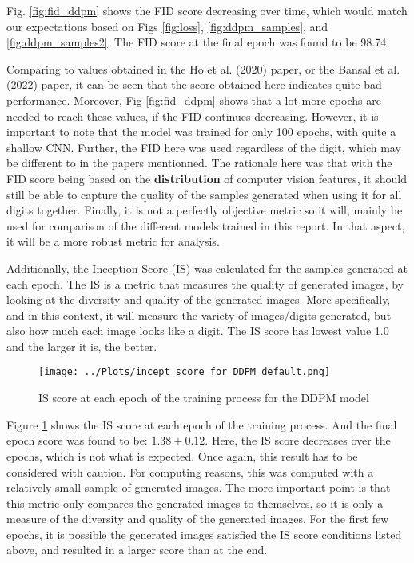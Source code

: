 \documentclass[12pt]{report} %
\begin{document}
Fig. \ref{fig:fid_ddpm} shows the FID score decreasing over time, which would match our expectations based on Figs \ref{fig:loss}, \ref{fig:ddpm_samples}, and \ref{fig:ddpm_samples2}. The FID score at the final epoch was found to be 98.74.

Comparing to values obtained in the Ho et al. (2020) paper\cite{ho2020denoising}, or the Bansal et al. (2022) paper\cite{bansal2022cold}, it can be seen that the score obtained here indicates quite bad performance. Moreover, Fig \ref{fig:fid_ddpm} shows that a lot more epochs are needed to reach these values, if the FID continues decreasing. However, it is important to note that the model was trained for only 100 epochs, with quite a shallow CNN. Further, the FID here was used regardless of the digit, which may be different to in the papers mentionned. The rationale here was that with the FID score being based on the \textbf{distribution} of computer vision features\cite{fid}, it should still be able to capture the quality of the samples generated when using it for all digits together. Finally, it is not a perfectly objective metric so it will, mainly be used for comparison of the different models trained in this report. In that aspect, it will be a more robust metric for analysis.

Additionally, the Inception Score (IS) was calculated for the samples generated at each epoch. The IS is a metric that measures the quality of generated images, by looking at the diversity and quality of the generated images\cite{inception_score}. More specifically, and in this context, it will measure the variety of images/digits generated, but also how much each image looks like a digit. The IS score has lowest value 1.0 and the larger it is, the better\cite{inception_score_implementation}.

\begin{figure}[ht]
  \centering
  \texttt{[image: ../Plots/incept\_score\_for\_DDPM\_default.png]}
  \captionsetup{font=footnotesize}
  \caption{IS score at each epoch of the training process for the DDPM model}
  \label{fig:is_ddpm}
\end{figure}

Figure \ref{fig:is_ddpm} shows the IS score at each epoch of the training process. And the final epoch score was found to be: $1.38 \pm 0.12$. Here, the IS score decreases over the epochs, which is not what is expected. Once again, this result has to be considered with caution. For computing reasons, this was computed with a relatively small sample of generated images. The more important point is that this metric only compares the generated images to themselves, so it is only a measure of the diversity and quality of the generated images. For the first few epochs, it is possible the generated images satisfied the IS score conditions listed above, and resulted in a larger score than at the end.
\end{document}
